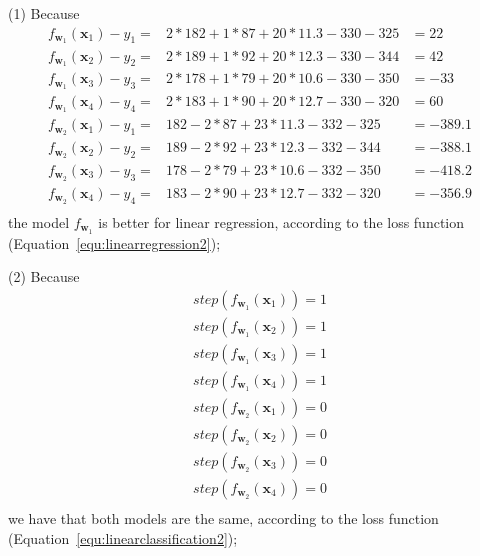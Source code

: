 \begin{newanswer*}
(1) Because 
\begin{equation}
\begin{array}{rll}
    f_{\textbf{w}_1}(\textbf{x}_1)-y_1 = & 2*182+1*87+20*11.3-330-325 & =  22 \\
    f_{\textbf{w}_1}(\textbf{x}_2)-y_2 = & 2*189+1*92+20*12.3-330-344 & =  42 \\
    f_{\textbf{w}_1}(\textbf{x}_3)-y_3 = & 2*178+1*79+20*10.6-330-350 & =  -33 \\
    f_{\textbf{w}_1}(\textbf{x}_4)-y_4 = & 2*183+1*90+20*12.7-330-320 & =  60 \\
    
    f_{\textbf{w}_2}(\textbf{x}_1)-y_1 = & 182-2*87+23*11.3-332-325 & =  -389.1 \\
    f_{\textbf{w}_2}(\textbf{x}_2)-y_2 = & 189-2*92+23*12.3-332-344 & =  -388.1 \\
    f_{\textbf{w}_2}(\textbf{x}_3)-y_3 = & 178-2*79+23*10.6-332-350 & =  -418.2 \\
    f_{\textbf{w}_2}(\textbf{x}_4)-y_4 = & 183-2*90+23*12.7-332-320 & =  -356.9 \\
\end{array}
\end{equation} the model $f_{\textbf{w}_1}$ is better for linear regression, according to the loss function (Equation~\ref{equ:linearregression2}); 

(2) Because
\begin{equation}
\begin{array}{cc}
    step(f_{\textbf{w}_1}(\textbf{x}_1))=1\\
    step(f_{\textbf{w}_1}(\textbf{x}_2))=1\\
    step(f_{\textbf{w}_1}(\textbf{x}_3))=1\\
    step(f_{\textbf{w}_1}(\textbf{x}_4))=1\\
    step(f_{\textbf{w}_2}(\textbf{x}_1))=0\\
    step(f_{\textbf{w}_2}(\textbf{x}_2))=0\\
    step(f_{\textbf{w}_2}(\textbf{x}_3))=0\\
    step(f_{\textbf{w}_2}(\textbf{x}_4))=0\\
\end{array}
\end{equation}
we have that both models are the same, according to the loss function (Equation~\ref{equ:linearclassification2}); 


\end{newanswer*}
